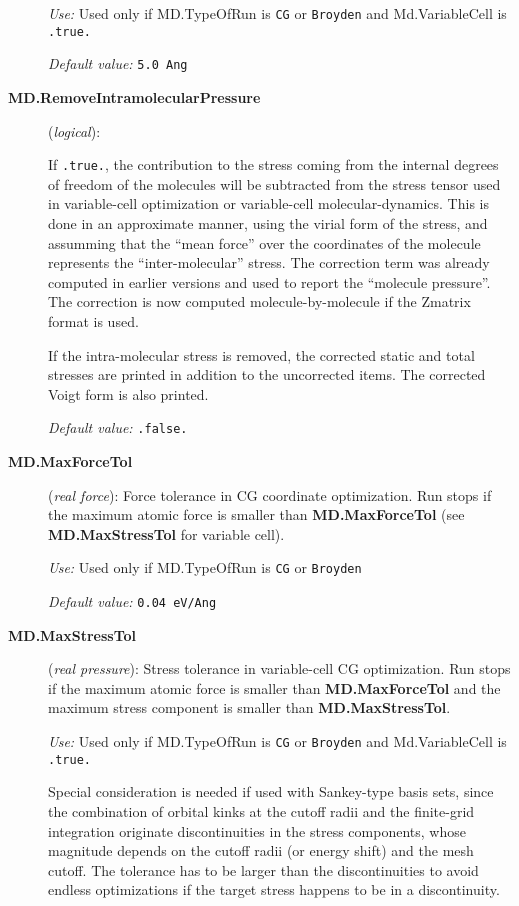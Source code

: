 \documentclass[11pt]{article}
\begin{document}
\begin{description}
{\it Use:} Used only if MD.TypeOfRun is {\tt CG} or {\tt Broyden} and
Md.VariableCell is {\tt .true.}
   
{\it Default value:} {\tt 5.0 Ang}
 
\item[{\bf MD.RemoveIntramolecularPressure}] ({\it logical}):
 

If {\tt .true.}, the contribution to the stress coming from the
internal degrees of freedom of the molecules will be subtracted from
the stress tensor used in variable-cell optimization or variable-cell
molecular-dynamics.  This is done in an approximate manner, using the
virial form of the stress, and assumming that the ``mean force'' over
the coordinates of the molecule represents the ``inter-molecular''
stress. The correction term was already computed in earlier versions
and used to report the ``molecule pressure''. The correction is now
computed molecule-by-molecule if the Zmatrix format is used.

If the intra-molecular stress is removed, the corrected static and
total stresses are printed in addition to the uncorrected items.
The corrected Voigt form is also printed.

{\it Default value:} {\tt .false.}

 
\item[{\bf MD.MaxForceTol}] ({\it real force}): 
Force tolerance in CG coordinate optimization.  
Run stops if the maximum atomic force is
smaller than {\bf MD.MaxForceTol} (see {\bf MD.MaxStressTol}
for variable cell).

{\it Use:} Used only if MD.TypeOfRun is {\tt CG} or {\tt Broyden}
    
{\it Default value:} {\tt 0.04 eV/Ang}


\item[{\bf MD.MaxStressTol}] ({\it real pressure}):
Stress tolerance in variable-cell CG optimization. Run stops
if the maximum atomic force is smaller than {\bf MD.MaxForceTol}
and the maximum stress component is smaller than {\bf MD.MaxStressTol}.

{\it Use:} Used only if MD.TypeOfRun is {\tt CG} or {\tt Broyden} and
Md.VariableCell is {\tt .true.}

Special consideration is needed if used with Sankey-type basis sets, since 
the combination of orbital kinks at the cutoff radii and the finite-grid
integration originate discontinuities in the
stress components, whose magnitude depends on the cutoff radii (or 
energy shift) and the mesh cutoff. The tolerance has to be larger
than the discontinuities to avoid endless optimizations if the target
stress happens to be in a discontinuity.
   

\end{description}
\end{document}
